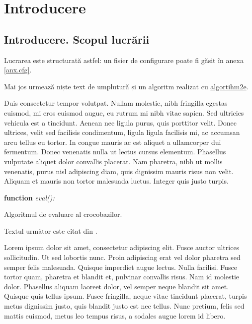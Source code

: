 \chapter{Introducere}

\section{Introducere. Scopul lucrării}

Lucrarea este structurată astfel: un fisier de configurare poate fi găsit în
anexa \ref{anx.cfg}.

Mai jos urmează niște text de umplutură și un algoritm realizat cu
\href{http://www.ctan.org/tex-archive/macros/latex/contrib/algorithm2e/algorithm2e.pdf}{algortihm2e}.

Duis consectetur tempor volutpat. Nullam molestie, nibh fringilla egestas
euismod, mi eros euismod augue, eu rutrum mi nibh vitae sapien. Sed ultricies
vehicula est a tincidunt. Aenean nec ligula purus, quis porttitor velit. Donec
ultrices, velit sed facilisis condimentum, ligula ligula facilisis mi, ac
accumsan arcu tellus eu tortor. In congue mauris ac est aliquet a ullamcorper
dui fermentum. Donec venenatis nulla ut lectus cursus elementum. Phasellus
vulputate aliquet dolor convallis placerat. Nam pharetra, nibh ut mollis
venenatis, purus nisl adipiscing diam, quis dignissim mauris risus non velit.
Aliquam et mauris non tortor malesuada luctus. Integer quis justo turpis.


\linesnumbered
\begin{algorithm}[htb]
	\dontprintsemicolon
	
	\textbf{function} \emph{eval():}\;
	\caption{Algoritmul de evaluare al crocobazilor.}
\end{algorithm}

Textul următor este citat din \cite{curs}.

Lorem ipsum dolor sit amet, consectetur adipiscing elit. Fusce auctor ultrices
sollicitudin. Ut sed lobortis nunc. Proin adipiscing erat vel dolor pharetra
sed semper felis malesuada. Quisque imperdiet augue lectus. Nulla facilisi.
Fusce tortor quam, pharetra et blandit et, pulvinar convallis risus. Nam id
molestie dolor. Phasellus aliquam laoreet dolor, vel semper neque blandit sit
amet. Quisque quis tellus ipsum. Fusce fringilla, neque vitae tincidunt
placerat, turpis metus dignissim justo, quis blandit justo est nec tellus. Nunc
pretium, felis sed mattis euismod, metus leo tempus risus, a sodales augue
lorem id libero.

